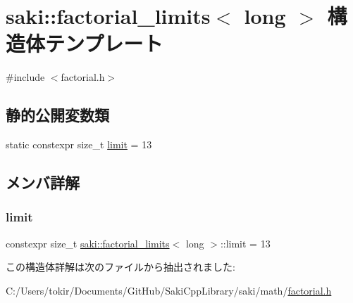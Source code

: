\hypertarget{structsaki_1_1factorial__limits_3_01long_01_4}{}\section{saki\+:\+:factorial\+\_\+limits$<$ long $>$ 構造体テンプレート}
\label{structsaki_1_1factorial__limits_3_01long_01_4}


{\ttfamily \#include $<$factorial.\+h$>$}

\subsection*{静的公開変数類}
\begin{DoxyCompactItemize}
\item 
static constexpr size\+\_\+t \mbox{\hyperlink{structsaki_1_1factorial__limits_3_01long_01_4_ae7124e54a372419173270e3142865be2}{limit}} = 13
\end{DoxyCompactItemize}


\subsection{メンバ詳解}
\mbox{\label{structsaki_1_1factorial__limits_3_01long_01_4_ae7124e54a372419173270e3142865be2}} 
\subsubsection{\texorpdfstring{limit}{limit}}
{\footnotesize\ttfamily constexpr size\+\_\+t \mbox{\hyperlink{structsaki_1_1factorial__limits}{saki\+::factorial\+\_\+limits}}$<$ long $>$\+::limit = 13\hspace{0.3cm}{\ttfamily [static]}}



この構造体詳解は次のファイルから抽出されました\+:\begin{DoxyCompactItemize}
\item 
C\+:/\+Users/tokir/\+Documents/\+Git\+Hub/\+Saki\+Cpp\+Library/saki/math/\mbox{\hyperlink{factorial_8h}{factorial.\+h}}\end{DoxyCompactItemize}
